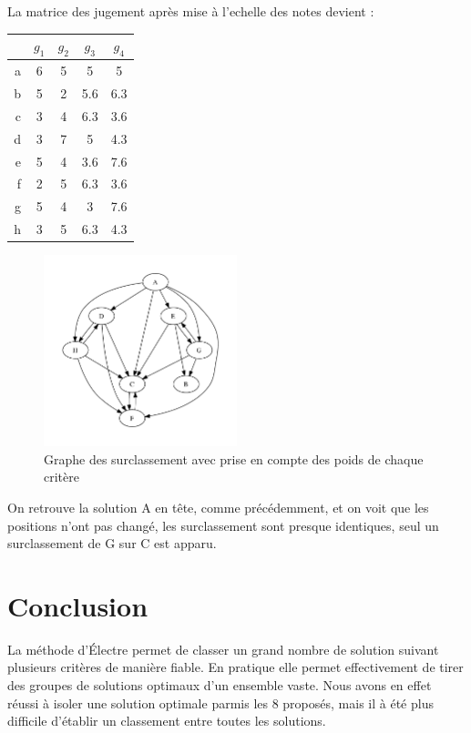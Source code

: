 La matrice des jugement après mise à l'echelle des notes devient :
\begin{center}
\begin{tabular}{r | c c c c}
~ & $g_1$ & $g_2$ & $g_3$ & $g_4$ \\ \hline
a & 6 & 5 & 5   & 5   \\
b & 5 & 2 & 5.6 & 6.3 \\
c & 3 & 4 & 6.3 & 3.6 \\
d & 3 & 7 & 5   & 4.3 \\
e & 5 & 4 & 3.6 & 7.6 \\
f & 2 & 5 & 6.3 & 3.6 \\
g & 5 & 4 & 3   & 7.6 \\
h & 3 & 5 & 6.3 & 4.3 \\
\end{tabular}
\end{center}
\clearpage
	
\begin{figure}[!h]
\begin{center}
\includegraphics[width=0.5\textwidth]{../SourcesMatlab/electre3-2.pdf}
\caption{Graphe des surclassement avec prise en compte des poids de chaque critère}
\end{center}
\end{figure}

On retrouve la solution A en tête, comme précédemment, et on voit que les positions n'ont pas changé, les surclassement sont presque identiques, seul un surclassement de G sur C est apparu.

\section{Conclusion}

La méthode d'Électre  permet de classer un grand nombre de solution suivant plusieurs critères de manière fiable. En pratique elle permet effectivement de tirer des groupes de solutions optimaux d'un ensemble vaste.
Nous avons en effet réussi à isoler une solution optimale parmis les 8 proposés, mais il à été plus difficile d'établir un classement entre toutes les solutions.